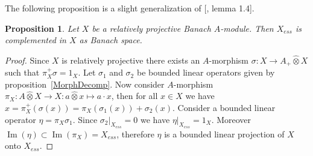 \documentclass[12pt]{article}
\newtheorem{proposition}[theorem]{Proposition}
\newcommand{\projtens}{\mathbin{\widehat{\otimes}}}
\begin{document}
The following proposition is a slight generalization of
    [\cite{SelivBiprojBanAlg}, lemma 1.4].

\begin{proposition}\label{ProjModEssPartCompl} Let $X$ be a relatively
    projective Banach $A$-module. Then $X_{ess}$ is complemented in $X$ as
    Banach space.
\end{proposition}
\begin{proof} Since $X$ is relatively projective there exists an $A$-morphism
    $\sigma:X\to A_+\projtens X$ such that $\pi_X^+\sigma=1_X$. Let $\sigma_1$
    and $\sigma_2$ be bounded linear operators given by
    proposition~\ref{MorphDecomp}. Now consider $A$-morphism $\pi_X:A\projtens
        X\to X:a\projtens x\mapsto a\cdot x$, then for all $x\in X$ we have
    $x=\pi_X^+(\sigma(x))=\pi_X(\sigma_1(x)) + \sigma_2(x)$. Consider a bounded
    linear operator $\eta = \pi_X\sigma_1$. Since $\sigma_2|_{X_{ess}}=0$ we
    have $\eta|_{X_{ess}}=1_X$. Moreover
    $\operatorname{Im}(\eta)\subset\operatorname{Im}(\pi_X)=X_{ess}$, therefore
    $\eta$ is a bounded linear projection of $X$ onto $X_{ess}$.
\end{proof}
\end{document}
